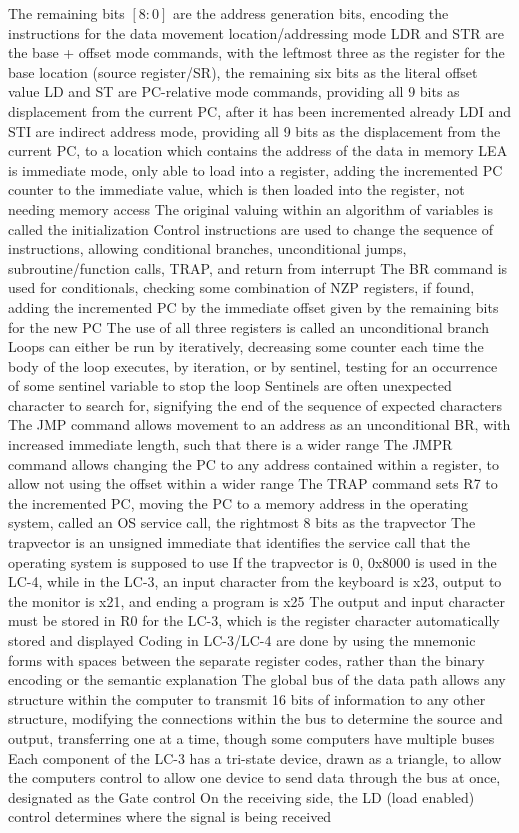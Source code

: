 \documentclass[11 pt, twoside]{article}
\newenvironment{outline*}
{
	\begin{outline}[enumerate]
	}
	{\end{outline}
}
\begin{document}
\begin{outline*}
\3 The remaining bits $[8:0]$ are the address generation bits, encoding the instructions for the data movement location/addressing mode
\3 LDR and STR are the base + offset mode commands, with the leftmost three as the register for the base location (source register/SR), the remaining six bits as the literal offset value
\3 LD and ST are PC-relative mode commands, providing all 9 bits as displacement from the current PC, after it has been incremented already
\3 LDI and STI are indirect address mode, providing all 9 bits as the displacement from the current PC, to a location which contains the address of the data in memory
\3 LEA is immediate mode, only able to load into a register, adding the incremented PC counter to the immediate value, which is then loaded into the register, not needing memory access
\2 The original valuing within an algorithm of variables is called the initialization
\1 Control instructions are used to change the sequence of instructions, allowing conditional branches, unconditional jumps, subroutine/function calls, TRAP, and return from interrupt
\2 The BR command is used for conditionals, checking some combination of NZP registers, if found, adding the incremented PC by the immediate offset given by the remaining bits for the new PC 
\3 The use of all three registers is called an unconditional branch
\3 Loops can either be run by iteratively, decreasing some counter each time the body of the loop executes, by iteration, or by sentinel, testing for an occurrence of some sentinel variable to stop the loop
\4 Sentinels are often unexpected character to search for, signifying the end of the sequence of expected characters
\2 The JMP command allows movement to an address as an unconditional BR, with increased immediate length, such that there is a wider range
\3 The JMPR command allows changing the PC to any address contained within a register, to allow not using the offset within a wider range
\2 The TRAP command sets R7 to the incremented PC, moving the PC to a memory address in the operating system, called an OS service call, the rightmost 8 bits as the trapvector
\3 The trapvector is an unsigned immediate that identifies the service call that the operating system is supposed to use
\3 If the trapvector is 0, 0x8000 is used in the LC-4, while in the LC-3, an input character from the keyboard is x23, output to the monitor is x21, and ending a program is x25
\3 The output and input character must be stored in R0 for the LC-3, which is the register character automatically stored and displayed
\1 Coding in LC-3/LC-4 are done by using the mnemonic forms with spaces between the separate register codes, rather than the binary encoding or the semantic explanation
\1 The global bus of the data path allows any structure within the computer to transmit 16 bits of information to any other structure, modifying the connections within the bus to determine the source and output, transferring one at a time, though some computers have multiple buses
\2 Each component of the LC-3 has a tri-state device, drawn as a triangle, to allow the computers control to allow one device to send data through the bus at once, designated as the Gate control
\2 On the receiving side, the LD (load enabled) control determines where the signal is being received
\end{outline*}
\end{document}
